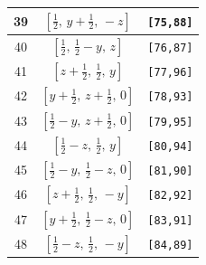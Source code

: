 \documentclass[fleqn,8pt]{jsarticle}
\begin{document}
\begin{longtable}{ccc}
39 & $\left[ \frac{1}{2},\, y + \frac{1}{2},\, - z \right]$ & {\tt [75,88]} \\ \hline
40 & $\left[ \frac{1}{2},\, \frac{1}{2} - y,\, z \right]$ & {\tt [76,87]} \\ \hline
41 & $\left[ z + \frac{1}{2},\, \frac{1}{2},\, y \right]$ & {\tt [77,96]} \\ \hline
42 & $\left[ y + \frac{1}{2},\, z + \frac{1}{2},\, 0 \right]$ & {\tt [78,93]} \\ \hline
43 & $\left[ \frac{1}{2} - y,\, z + \frac{1}{2},\, 0 \right]$ & {\tt [79,95]} \\ \hline
44 & $\left[ \frac{1}{2} - z,\, \frac{1}{2},\, y \right]$ & {\tt [80,94]} \\ \hline
45 & $\left[ \frac{1}{2} - y,\, \frac{1}{2} - z,\, 0 \right]$ & {\tt [81,90]} \\ \hline
46 & $\left[ z + \frac{1}{2},\, \frac{1}{2},\, - y \right]$ & {\tt [82,92]} \\ \hline
47 & $\left[ y + \frac{1}{2},\, \frac{1}{2} - z,\, 0 \right]$ & {\tt [83,91]} \\ \hline
48 & $\left[ \frac{1}{2} - z,\, \frac{1}{2},\, - y \right]$ & {\tt [84,89]} \\
\end{longtable}
\renewcommand{\arraystretch}{1.2}
\end{document}
